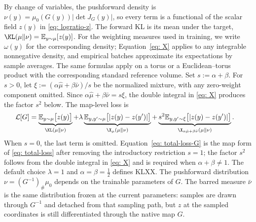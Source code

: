 \documentclass{article}
\begin{document}
By change of variables, the pushforward density is $\nu(y)=\mu_0(G(y))|\det J_G(y)|$, so every term is a functional of the scalar field $z(y)$ in \eqref{eq: logratio-z}. The forward KL is its mean under the target, $\KL(\mu\|\nu)=\mathbb E_{y\sim\mu}[z(y)]$. For the weighting measures used in training, we write $\omega(y)$ for the corresponding density; Equation~\eqref{eq: X} applies to any integrable nonnegative density, and empirical batches approximate its expectations by sample averages. The same formulas apply on a torus or a Euclidean--torus product with the corresponding standard reference volume. Set $s:=\alpha+\beta$. For $s>0$, let $\xi:=(\alpha\hat\mu+\beta\bar\nu)/s$ be the normalized mixture, with any zero-weight component omitted. Since $\alpha\hat\mu+\beta\bar\nu=s\xi$, the double integral in \eqref{eq: X} produces the factor $s^2$ below. The map-level loss is
\begin{align}
    \mathcal{L}[G]
    &= \underbrace{\mathbb{E}_{y \sim \mu}\bigl[z(y)\bigr]}_{\KL(\mu\|\nu)}
     + \lambda \underbrace{\mathbb{E}_{y, y' \sim \mu}\bigl[|z(y) - z(y')|\bigr]}_{\X_\mu(\mu\|\nu)}
     + \underbrace{s^2\mathbb{E}_{y, y' \sim \xi}\bigl[|z(y) - z(y')|\bigr]}_{\X_{\alpha\hat\mu + \beta\bar\nu}(\mu\|\nu)} .
    \label{eq: total-loss-G}
\end{align}
When $s=0$, the last term is omitted. Equation~\eqref{eq: total-loss-G} is the map form of \eqref{eq: total-loss} after removing the introductory restriction $s=1$; the factor $s^2$ follows from the double integral in \eqref{eq: X} and is required when $\alpha+\beta\ne1$. The default choice $\lambda=1$ and $\alpha=\beta=\frac12$ defines KLXX. The pushforward distribution $\nu=(G^{-1})_{\#}\mu_0$ depends on the trainable parameters of $G$. The barred measure $\bar\nu$ is the same distribution frozen at the current parameters: samples are drawn through $G^{-1}$ and detached from that sampling path, but $z$ at the sampled coordinates is still differentiated through the native map $G$.
\end{document}
